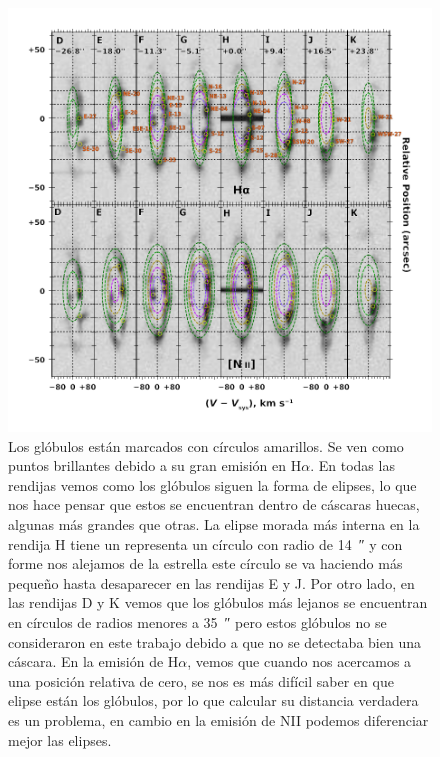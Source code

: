\documentclass{book}
\begin{document}
\begin{figure}[htb]
    \centering
    \includegraphics[width=\textwidth]{Nuevas imagenes finales/zavala-slit-spectra-select-annotated.pdf}
    \caption{Los glóbulos están marcados con círculos amarillos. Se ven como puntos brillantes debido a su gran emisión en H$\alpha$. En todas las rendijas vemos como los glóbulos siguen la forma de elipses, lo que nos hace pensar que estos se encuentran dentro de cáscaras huecas, algunas más grandes que otras. La elipse morada más interna en la rendija H tiene un representa un círculo con radio de \SI{14}{\arcsecond} y con forme nos alejamos de la estrella este círculo se va haciendo más pequeño hasta desaparecer en las rendijas E y J. Por otro lado, en las rendijas D y K vemos que los glóbulos más lejanos se encuentran en círculos de radios menores a \SI{35}{\arcsecond} pero estos glóbulos no se consideraron en este trabajo debido a que no se detectaba bien una cáscara. En la emisión de H$\alpha$, vemos que cuando nos acercamos a una posición relativa de cero, se nos es más difícil saber en que elipse están los glóbulos, por lo que calcular su distancia verdadera es un problema, en cambio en la emisión de NII podemos diferenciar mejor las elipses.}
    \label{fig:zavala_nudos}
\end{figure}
\end{document}

